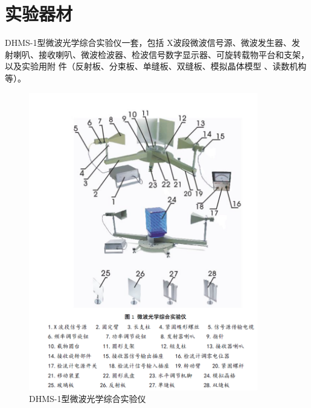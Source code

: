 \documentclass[11pt]{article}
\begin{document}
\section{实验器材}

    \par \indent DHMS-1型微波光学综合实验仪一套，包括 X波段微波信号源、微波发生器、发
    射喇叭、接收喇叭、微波检波器、检波信号数字显示器、可旋转载物平台和支架，以及实验用附
    件（反射板、分束板、单缝板、双缝板、模拟晶体模型 、读数机构等）。
    \begin{figure}[H]
        \centering
        \includegraphics[width=10cm]{Fig/2.png}
        \caption{DHMS-1型微波光学综合实验仪}
    \end{figure}
\end{document}
